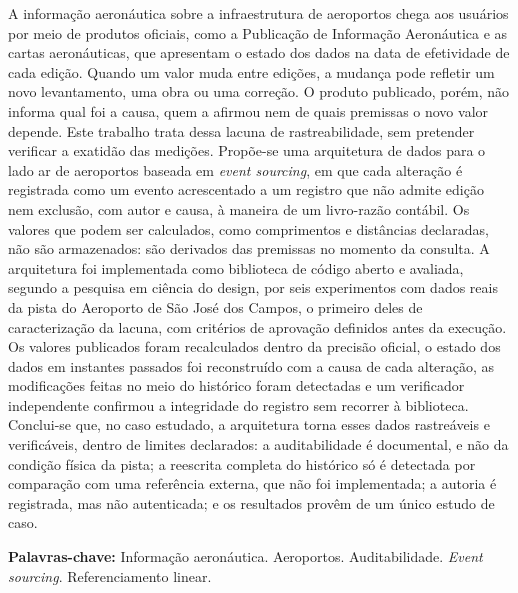 A informação aeronáutica sobre a infraestrutura de aeroportos chega aos usuários por meio de produtos oficiais, como a Publicação de Informação Aeronáutica e as cartas aeronáuticas, que apresentam o estado dos dados na data de efetividade de cada edição. 
Quando um valor muda entre edições, a mudança pode refletir um novo levantamento, uma obra ou uma correção. O produto publicado, porém, não informa qual foi a causa, quem a afirmou nem de quais premissas o novo valor depende. 
Este trabalho trata dessa lacuna de rastreabilidade, sem pretender verificar a exatidão das medições. 
Propõe-se uma arquitetura de dados para o lado ar de aeroportos baseada em \textit{event sourcing}, em que cada alteração é registrada como um evento acrescentado a um registro que não admite edição nem exclusão, com autor e causa, à maneira de um livro-razão contábil. 
Os valores que podem ser calculados, como comprimentos e distâncias declaradas, não são armazenados: são derivados das premissas no momento da consulta. 
A arquitetura foi implementada como biblioteca de código aberto e avaliada, segundo a pesquisa em ciência do design, por seis experimentos com dados reais da pista do Aeroporto de São José dos Campos, o primeiro deles de caracterização da lacuna, com critérios de aprovação definidos antes da execução. 
Os valores publicados foram recalculados dentro da precisão oficial, o estado dos dados em instantes passados foi reconstruído com a causa de cada alteração, as modificações feitas no meio do histórico foram detectadas e um verificador independente confirmou a integridade do registro sem recorrer à biblioteca. 
Conclui-se que, no caso estudado, a arquitetura torna esses dados rastreáveis e verificáveis, dentro de limites declarados: a auditabilidade é documental, e não da condição física da pista; a reescrita completa do histórico só é detectada por comparação com uma referência externa, que não foi implementada; a autoria é registrada, mas não autenticada; e os resultados provêm de um único estudo de caso.

\bigskip
\noindent\textbf{Palavras-chave:} Informação aeronáutica. Aeroportos.
Auditabilidade. \textit{Event sourcing}. Referenciamento linear.